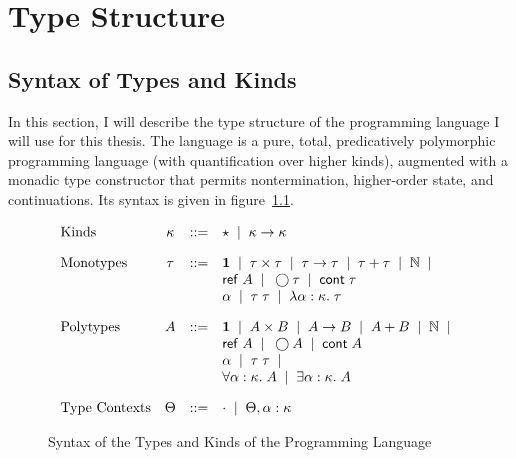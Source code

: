 \chapter{Type Structure}

\section{Syntax of Types and Kinds}

In this section, I will describe the type structure of the 
programming language I will use for this thesis. The language is a
pure, total, predicatively polymorphic programming language (with
quantification over higher kinds), augmented with a monadic type
constructor that permits nontermination, higher-order state, and
continuations. Its syntax is given in figure~\ref{lang-type-syntax}. 


\begin{figure}[h]
\begin{displaymath}
  \begin{array}{lcll}
    \mbox{Kinds} & 
      \kappa & ::= & \star \;\;|\;\; \kappa \to \kappa 
    \\[1em]
    \mbox{Monotypes} & 
      \tau & ::= & 
         \mathbf{1} \;\;|\;\; 
         \tau \times \tau \;\;|\;\; 
         \tau \to \tau \;\;|\;\; 
         \tau + \tau \;\;|\;\;
         \mathbb{N} \;\;|\;\; \\
     &&& \mathsf{ref}\;A \;\;|\;\;
         \bigcirc{\tau} \;\;|\;\; 
         \mathsf{cont}\;{\tau} \\
     &&& \alpha \;\;|\;\;
         \tau\;\tau \;\;|\;\; 
         \lambda \alpha:\kappa.\;\tau 
    \\[1em]
    \mbox{Polytypes} & 
      A & ::= & 
         \mathbf{1} \;\;|\;\; 
         A \times B \;\;|\;\; 
         A \to B \;\;|\;\; 
         A + B \;\;|\;\;
         \mathbb{N} \;\;|\;\;  \\
    &&&  \mathsf{ref}\;A \;\;|\;\;
         \bigcirc{A} \;\;|\;\; 
         \mathsf{cont}\;{A} \\
    &&&  \alpha \;\;|\;\;
         \tau\;\tau \;\;|\;\; \\
    &&&  \forall \alpha:\kappa.\; A \;\;|\;\; 
         \exists \alpha:\kappa.\; A \\[1em]
    \mbox{Type Contexts} & 
      \Theta & ::= & \cdot \;\;|\;\; \Theta, \alpha:\kappa \\
  \end{array}
\end{displaymath}
\caption{Syntax of the Types and Kinds of the Programming Language}
\label{lang-type-syntax}
\end{figure}

